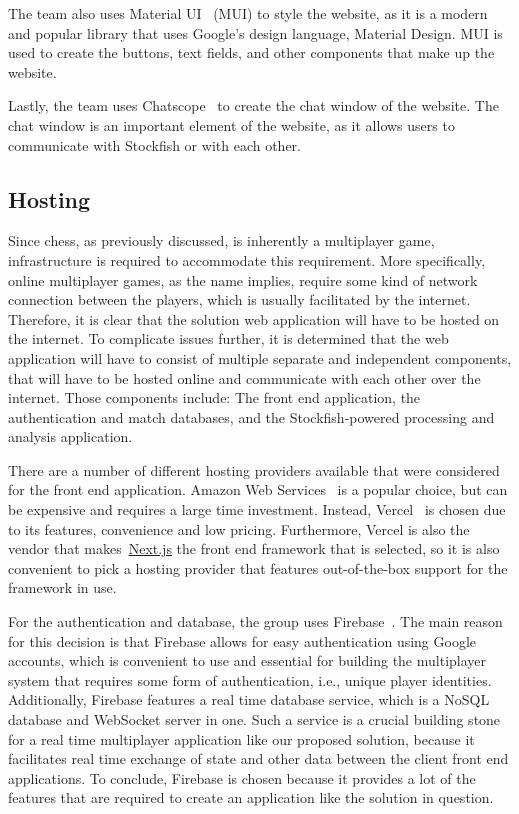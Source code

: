 The team also uses Material UI~\cite{mui} (MUI) to style the website, as it is a modern and popular library that
uses Google's design language, Material Design.
MUI is used to create the buttons, text fields, and other components that make up the website.

Lastly, the team uses Chatscope~\cite{chatscope} to create the chat window of the website.
The chat window is an important element of the website, as it allows users to communicate with Stockfish or with each
other.


\subsection{Hosting}\label{subsec:hosting}

Since chess, as previously discussed, is inherently a multiplayer game,
infrastructure is required to accommodate this requirement.
More specifically, online multiplayer games, as the name implies, require some kind of network connection between the
players, which is usually facilitated by the internet.
Therefore, it is clear that the solution web application will have to be hosted on the internet.
To complicate issues further, it is determined that the web application will have to consist of multiple separate and
independent components, that will have to be hosted online and communicate with each other over the internet.
Those components include: The front end application, the authentication and match databases, and the Stockfish-powered
processing and analysis application.

There are a number of different hosting providers available that were considered for the front end application.
Amazon Web Services~\cite{aws} is a popular choice, but can be expensive and requires a large time investment.
Instead, Vercel~\cite{vercel} is chosen due to its features, convenience and low pricing.
Furthermore, Vercel is also the vendor that makes~\url{Next.js} the front end framework that is selected,
so it is also convenient to pick a hosting provider that features out-of-the-box support for the framework in use.

For the authentication and database, the group uses Firebase~\cite{firebase}.
The main reason for this decision is that Firebase allows for easy authentication using Google accounts, which is
convenient to use and essential for building the multiplayer system that requires some form of authentication,
i.e., unique player identities.
Additionally, Firebase features a real time database service, which is a NoSQL database and WebSocket server in one.
Such a service is a crucial building stone for a real time multiplayer application like our proposed solution, because
it facilitates real time exchange of state and other data between the client front end applications.
To conclude, Firebase is chosen because it provides a lot of the features that are required to create an application
like the solution in question.

